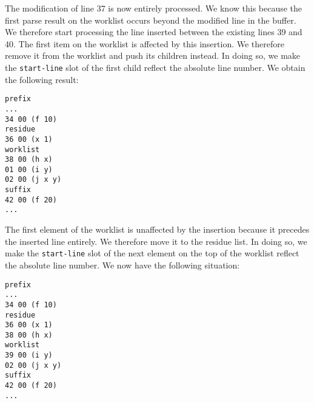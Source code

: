 The modification of line 37 is now entirely processed.  We know this
because the first parse result on the worklist occurs beyond the
modified line in the buffer.  We therefore start processing the line
inserted between the existing lines 39 and 40.  The first item on the
worklist is affected by this insertion.  We therefore remove it from
the worklist and push its children instead.  In doing so, we make the
\texttt{start-line} slot of the first child reflect the absolute line
number.  We obtain the following result:

\begin{verbatim}
prefix
...
34 00 (f 10)
residue
36 00 (x 1)
worklist
38 00 (h x)
01 00 (i y)
02 00 (j x y)
suffix
42 00 (f 20)
...
\end{verbatim}

The first element of the worklist is unaffected by the insertion
because it precedes the inserted line entirely.  We therefore move it
to the residue list.  In doing so, we make the \texttt{start-line}
slot of the next element on the top of the worklist reflect the
absolute line number.  We now have the following situation:

\begin{verbatim}
prefix
...
34 00 (f 10)
residue
36 00 (x 1)
38 00 (h x)
worklist
39 00 (i y)
02 00 (j x y)
suffix
42 00 (f 20)
...
\end{verbatim}
